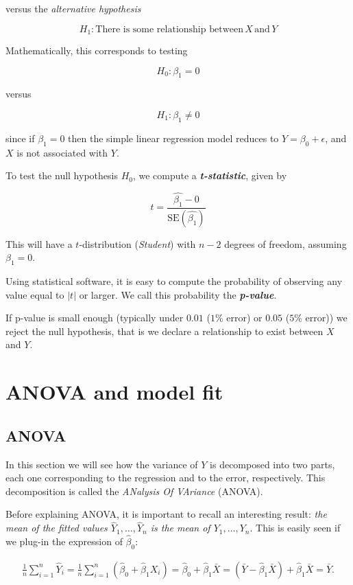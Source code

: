 \documentclass[]{book}
\begin{document}
versus the \emph{alternative hypothesis}

\[ H_1 : \text{There is some relationship between} \, X \, \text{and} \, Y \]

Mathematically, this corresponds to testing

\[ H_0 : \beta_1 = 0 \]

versus

\[ H_1 : \beta_1 \neq 0 \]

since if \(\beta_1 = 0\) then the simple linear regression model reduces
to \(Y = \beta_0 + \epsilon\), and \(X\) is not associated with \(Y\).

To test the null hypothesis \(H_0\), we compute a
\textbf{\emph{t-statistic}}, given by

\[ t = \frac{\hat{\beta_1} - 0}{\text{SE}(\hat{\beta_1})} \]

This will have a \(t\)-distribution (\emph{Student}) with \(n-2\)
degrees of freedom, assuming \(\beta_1=0\).

Using statistical software, it is easy to compute the probability of
observing any value equal to \(|t|\) or larger. We call this probability
the \textbf{\emph{p-value}}.

If p-value is small enough (typically under \(0.01\) (\(1\%\) error) or
\(0.05\) (\(5\%\) error)) we reject the null hypothesis, that is we
declare a relationship to exist between \(X\) and \(Y\).

\section{ANOVA and model fit}\label{anova-and-model-fit}

\subsection{ANOVA}\label{anova}

In this section we will see how the variance of \(Y\) is decomposed into
two parts, each one corresponding to the regression and to the error,
respectively. This decomposition is called the \emph{ANalysis Of
VAriance} (ANOVA).

Before explaining ANOVA, it is important to recall an interesting
result: \emph{the mean of the fitted values \(\hat Y_1,\ldots,\hat Y_n\)
is the mean of \(Y_1,\ldots, Y_n\)}. This is easily seen if we plug-in
the expression of \(\hat\beta_0\):

\begin{align*}
\frac{1}{n}\sum_{i=1}^n \hat Y_i=\frac{1}{n}\sum_{i=1}^n \left(\hat \beta_0+\hat\beta_1X_i\right)=\hat \beta_0+\hat\beta_1\bar X=\left(\bar Y - \hat\beta_1\bar X \right) + \hat\beta_1\bar X=\bar Y.
\end{align*}
\end{document}
